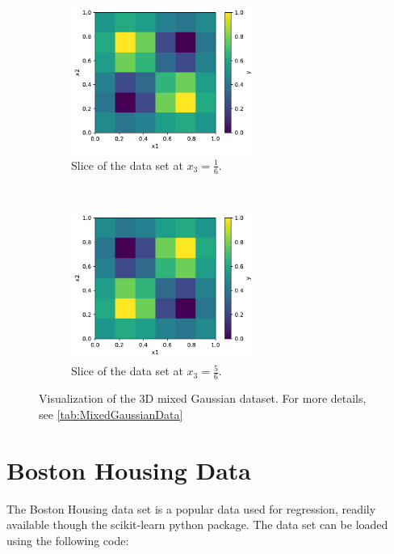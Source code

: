\begin{figure}[H]
    \centering
    \begin{subfigure}[t]{0.5\textwidth}
        \centering
        \includegraphics[height=1.9in]{latex/figures/gaussian_3D_1.pdf}
        \caption{Slice of the data set at $x_3 = \frac{1}{6}$.}
        
    \end{subfigure}%
    ~ 
    \begin{subfigure}[t]{0.5\textwidth}
        \centering
        \includegraphics[height=1.9in]{latex/figures/gaussian_3D_2.pdf}
        \caption{Slice of the data set at $x_3 = \frac{5}{6}$.}
    \end{subfigure}
    \caption{Visualization of the 3D mixed Gaussian dataset. For more details, see \autoref{tab:MixedGaussianData}}
    \label{fig:mixed Gaussian 3D}
\end{figure}





\section{Boston Housing Data}\label{sec:Boston Housing Data}
The Boston Housing data set is a popular data used for regression, readily available though the scikit-learn python package\cite{scikit-learn}. The data set can be loaded using the following code:

